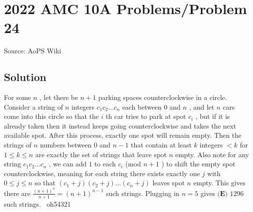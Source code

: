\documentclass[12pt]{article}
\begin{document}
\section*{{2022 AMC 10A Problems/Problem 24}}
Source: AoPS Wiki

\subsection*{Solution}
For some $n$ , let there be $n+1$ parking spaces counterclockwise in a circle. Consider a string of $n$ integers $c_1c_2 \ldots c_n$ each between $0$ and $n$ , and let $n$ cars come into this circle so that the $i$ th car tries to park at spot $c_i$ , but if it is already taken then it instead keeps going counterclockwise and takes the next available spot. After this process, exactly one spot will remain empty. Then the strings of $n$ numbers between $0$ and $n-1$ that contain at least $k$ integers $<k$ for $1 \leq k \leq n$ are exactly the set of strings that leave spot $n$ empty. Also note for any string $c_1c_2 \ldots c_n$ , we can add $1$ to each $c_i$ (mod $n+1$ ) to shift the empty spot counterclockwise, meaning for each string there exists exactly one $j$ with $0 \leq j \leq n$ so that $(c_1+j)(c_2+j) \ldots (c_n+j)$ leaves spot $n$ empty. This gives there are $\frac{(n+1)^{n}}{n+1} = (n+1)^{n-1}$ such strings. Plugging in $n = 5$ gives $\boxed{\textbf{(E) }1296}$ such strings. ~oh54321
\end{document}
